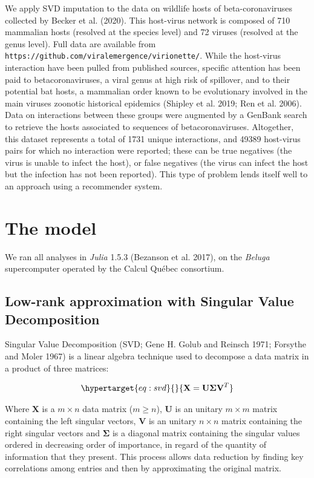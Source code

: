 \documentclass[11pt]{article}
\begin{document}
We apply SVD imputation to the data on wildlife hosts of
beta-coronaviruses collected by Becker et al. (2020). This host-virus
network is composed of 710 mammalian hosts (resolved at the species
level) and 72 viruses (resolved at the genus level). Full data are
available from \texttt{https://github.com/viralemergence/virionette/}.
While the host-virus interaction have been pulled from published
sources, specific attention has been paid to betacoronaviruses, a viral
genus at high risk of spillover, and to their potential bat hosts, a
mammalian order known to be evolutionary involved in the main viruses
zoonotic historical epidemics (Shipley et al. 2019; Ren et al. 2006).
Data on interactions between these groups were augmented by a GenBank
search to retrieve the hosts associated to sequences of
betacoronaviruses. Altogether, this dataset represents a total of 1731
unique interactions, and 49389 host-virus pairs for which no interaction
were reported; these can be true negatives (the virus is unable to
infect the host), or false negatives (the virus can infect the host but
the infection has not been reported). This type of problem lends itself
well to an approach using a recommender system.

\hypertarget{the-model}{%
\section{The model}\label{the-model}}

We ran all analyses in \emph{Julia} 1.5.3 (Bezanson et al. 2017), on the
\emph{Beluga} supercomputer operated by the Calcul Québec consortium.

\hypertarget{low-rank-approximation-with-singular-value-decomposition}{%
\subsection{Low-rank approximation with Singular Value
Decomposition}\label{low-rank-approximation-with-singular-value-decomposition}}

Singular Value Decomposition (SVD; Gene H. Golub and Reinsch 1971;
Forsythe and Moler 1967) is a linear algebra technique used to decompose
a data matrix in a product of three matrices:

\begin{equation}\protect\hypertarget{eq:svd}{}{\mathbf{X} =  \mathbf{U \Sigma V}^T}\label{eq:svd}\end{equation}

Where \(\mathbf{X}\) is a \(m \times n\) data matrix (\(m \ge n\)),
\(\mathbf{U}\) is an unitary \(m \times m\) matrix containing the left
singular vectors, \(\mathbf{V}\) is an unitary \(n \times n\) matrix
containing the right singular vectors and \(\mathbf{\Sigma}\) is a
diagonal matrix containing the singular values ordered in decreasing
order of importance, in regard of the quantity of information that they
present. This process allows data reduction by finding key correlations
among entries and then by approximating the original matrix.
\end{document}
